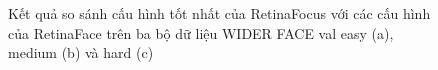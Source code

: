 {    \begin{figure}[H]
        \centering
        \caption{Kết quả so sánh cấu hình tốt nhất của RetinaFocus với các cấu hình của RetinaFace trên ba bộ dữ liệu WIDER FACE val easy (a), medium (b) và hard (c)}
        \label{fig:retinafocus_widerface_val_rtnf}
    \end{figure}

}

